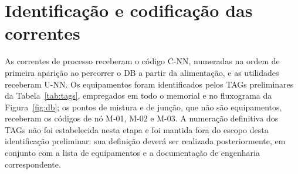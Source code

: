\documentclass[11pt,a4paper]{article}
\numberwithin{equation}{section}
\numberwithin{table}{section}
\numberwithin{figure}{section}
\begin{document}
\section{Identificação e codificação das correntes}
As correntes de processo receberam o código C-NN, numeradas na ordem de primeira aparição ao percorrer o DB a partir da alimentação, e as utilidades receberam U-NN. Os equipamentos foram identificados pelos TAGs preliminares da Tabela~\ref{tab:tags}, empregados em todo o memorial e no fluxograma da Figura~\ref{fig:db}; os pontos de mistura e de junção, que não são equipamentos, receberam os códigos de nó M-01, M-02 e M-03. A numeração definitiva dos TAGs não foi estabelecida nesta etapa e foi mantida fora do escopo desta identificação preliminar: sua definição deverá ser realizada posteriormente, em conjunto com a lista de equipamentos e a documentação de engenharia correspondente.
\end{document}
